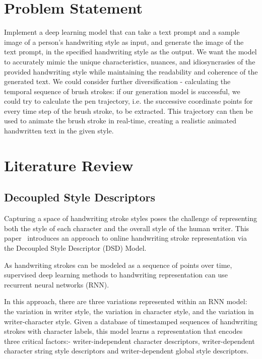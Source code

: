 \documentclass[10pt,twocolumn,letterpaper]{article}
\begin{document}
\section{Problem Statement}
\label{sec: PS}
Implement a deep learning model that can take a text prompt and a sample image of a person's handwriting style as input, and generate the image of the text prompt, in the specified handwriting style as the output. We want the model to accurately mimic the unique characteristics, nuances, and idiosyncrasies of the provided handwriting style while maintaining the readability and coherence of the generated text. We could consider further diversification - calculating the temporal sequence of brush strokes: if our generation model is successful, we could try to calculate the pen trajectory, i.e. the successive coordinate points for every time step of the brush stroke, to be extracted. This trajectory can then be used to animate the brush stroke in real-time, creating a realistic animated handwritten text in the given style.  


\section{Literature Review}
\label{sec: Lit Rev}

\subsection{Decoupled Style Descriptors\cite{BRUSH-paper}} 
\label{subsec: Brush Paper}
 Capturing a space of handwriting stroke styles poses the challenge of representing both the style of each character and the overall style of the human writer.
This paper~\cite{BRUSH-paper} introduces an approach to online handwriting stroke representation via the Decoupled Style Descriptor (DSD) Model. 

As handwriting strokes can be modeled as  a sequence of points over time, supervised deep learning methods to handwriting representation can use recurrent neural networks (RNN).

In this approach, there are three variations represented within an RNN model: the variation in writer style, the variation in character style, and the variation in writer-character style. Given a database of timestamped sequences of handwriting strokes with character labels, this model learns a representation that encodes three critical factors:- writer-independent character descriptors, writer-dependent character string style descriptors and writer-dependent global style descriptors.
\end{document}

